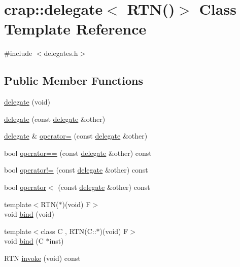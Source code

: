 \hypertarget{classcrap_1_1delegate_3_01_r_t_n_07_08_4}{}\section{crap\+:\+:delegate$<$ R\+T\+N()$>$ Class Template Reference}
\label{classcrap_1_1delegate_3_01_r_t_n_07_08_4}


{\ttfamily \#include $<$delegates.\+h$>$}

\subsection*{Public Member Functions}
\begin{DoxyCompactItemize}
\item 
\hyperlink{classcrap_1_1delegate_3_01_r_t_n_07_08_4_ab5c7616fc5bcd793f4a4f3e8d5948b41}{delegate} (void)
\item 
\hyperlink{classcrap_1_1delegate_3_01_r_t_n_07_08_4_a1a39ae5dd32b5fbabd7fa622d6815185}{delegate} (const \hyperlink{classcrap_1_1delegate}{delegate} \&other)
\item 
\hyperlink{classcrap_1_1delegate}{delegate} \& \hyperlink{classcrap_1_1delegate_3_01_r_t_n_07_08_4_a493ae9a2e7e34e32c26fad47b0aa5bae}{operator=} (const \hyperlink{classcrap_1_1delegate}{delegate} \&other)
\item 
bool \hyperlink{classcrap_1_1delegate_3_01_r_t_n_07_08_4_a8443a4831b9da95e99d91adfe928ce79}{operator==} (const \hyperlink{classcrap_1_1delegate}{delegate} \&other) const 
\item 
bool \hyperlink{classcrap_1_1delegate_3_01_r_t_n_07_08_4_aa8a1ceabdfe12dd6571835041d6776e8}{operator!=} (const \hyperlink{classcrap_1_1delegate}{delegate} \&other) const 
\item 
bool \hyperlink{classcrap_1_1delegate_3_01_r_t_n_07_08_4_a2f5be7ad80885926e369ad5a21d18d4e}{operator$<$} (const \hyperlink{classcrap_1_1delegate}{delegate} \&other) const 
\item 
{\footnotesize template$<$R\+T\+N($\ast$)(void) F$>$ }\\void \hyperlink{classcrap_1_1delegate_3_01_r_t_n_07_08_4_abc067ce13356a910f2cb3beef18c8c29}{bind} (void)
\item 
{\footnotesize template$<$class C , R\+T\+N(\+C\+::$\ast$)(void) F$>$ }\\void \hyperlink{classcrap_1_1delegate_3_01_r_t_n_07_08_4_aa7d8e2721ca741ce9a1d85520c9e888a}{bind} (C $\ast$inst)
\item 
R\+T\+N \hyperlink{classcrap_1_1delegate_3_01_r_t_n_07_08_4_a47fc3428351b7d75b722a814fe068cf6}{invoke} (void) const 
\end{DoxyCompactItemize}



